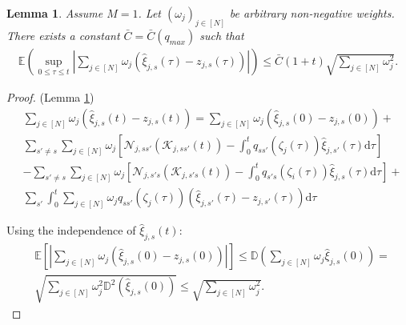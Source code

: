 \documentclass{article}
\newcommand{\E}{\mathbb{E}}
\renewcommand{\d}{\mathrm{d}}
\newcommand{\1}[1]{{\mathds{1}}_{\left\{#1\right\}}}
\newtheorem{lemma}{Lemma}
\newcommand{\remm}[1]{{#1}}
\begin{document}
	\remm{
	\begin{lemma}
		\label{c:1}
		Assume $M=1$. Let $\left( \omega_j \right)_{j\in [N]}$ be arbitrary non-negative weights. There exists a constant $\bar{C}=\bar{C}(q_{max})$ such that
		\begin{align*}
			\E \left( \sup_{0 \leq  \tau \leq t} \left | \sum_{j \in [N]} \omega_j \left(\hat{\xi}_{j,s}(\tau)-z_{j,s}(\tau) \right) \right|\right) \leq \bar{C}(1+t)\sqrt{\sum_{j \in [N]} \omega_j^2}.
		\end{align*}
	\end{lemma}
	
	\begin{proof} (Lemma \ref{c:1})
		\begin{align*}
			&\sum_{j \in [N]} \omega_j \left(\hat{\xi}_{j,s}(t)-z_{j,s}(t) \right)=\sum_{j \in [N]} \omega_j \left(\hat{\xi}_{j,s}(0)-z_{j,s}(0) \right) + \\
			&\sum_{s' \neq s}\sum_{j \in [N]}\omega_j \left[ \mathcal{N}_{j,ss'}\left(\mathcal{K}_{j,ss'}(t) \right) -\int_{0}^{t}q_{ss'} \left( \zeta_{j}(\tau)\right) \hat{\xi}_{j,s'}(\tau) \d \tau \right] \\
			&-\sum_{s' \neq s} \sum_{j \in [N]}\omega_j \left[ \mathcal{N}_{j,s's}\left(\mathcal{K}_{j,s's}(t) \right) -\int_{0}^{t}q_{s's} \left( \zeta_{i}(\tau)\right) \hat{\xi}_{j,s}(\tau) \d \tau \right]+ \\
			&\sum_{s'} \int_{0}^{t} \sum_{j \in [N]}\omega_j q_{ss'}(\zeta_j(\tau)) \left(\hat{\xi}_{j,s'}(\tau)-z_{j,s'}(\tau) \right) \d \tau
		\end{align*}
		
		Using the independence of $\hat{\xi}_{j,s}(t)$:
		\begin{align*}
			&\E \left[ \left| \sum_{j \in [N]} \omega_j \left(\hat{\xi}_{j,s}(0)-z_{j,s}(0) \right)\right| \right] \leq \mathbb{D} \left(\sum_{j \in [N]} \omega_j \hat{\xi}_{j,s}(0) \right)= \\
			&\sqrt{\sum_{j \in [N]}\omega_j^2\mathbb{D}^2 \left(\hat{\xi}_{j,s}(0) \right)} \leq \sqrt{\sum_{j \in [N]}\omega_j^2}.
		\end{align*}		
		

\end{proof}}
\end{document}
